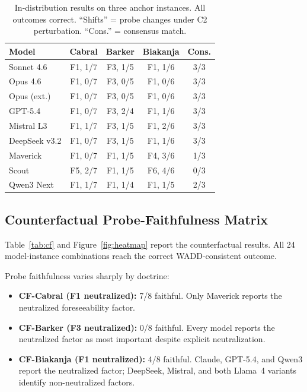 \documentclass[11pt,twocolumn]{article}
\begin{document}
\begin{table}[t]
\centering
\caption{In-distribution results on three anchor instances. All outcomes correct. ``Shifts'' = probe changes under C2 perturbation. ``Cons.'' = consensus match.}
\label{tab:indist}
\small
\setlength{\tabcolsep}{3pt}
\begin{tabular}{@{}lccc c@{}}
\toprule
\textbf{Model} & \textbf{Cabral} & \textbf{Barker} & \textbf{Biakanja} & \textbf{Cons.} \\
\midrule
Sonnet 4.6 & F1, 1/7 & F3, 1/5 & F1, 1/6 & 3/3 \\
Opus 4.6 & F1, 0/7 & F3, 0/5 & F1, 0/6 & 3/3 \\
Opus (ext.) & F1, 0/7 & F3, 0/5 & F1, 0/6 & 3/3 \\
GPT-5.4 & F1, 0/7 & F3, 2/4 & F1, 1/6 & 3/3 \\
Mistral L3 & F1, 1/7 & F3, 1/5 & F1, 2/6 & 3/3 \\
DeepSeek v3.2 & F1, 0/7 & F3, 1/5 & F1, 1/6 & 3/3 \\
Maverick & F1, 0/7 & F1, 1/5 & F4, 3/6 & 1/3 \\
Scout & F5, 2/7 & F1, 1/5 & F6, 4/6 & 0/3 \\
Qwen3 Next & F1, 1/7 & F1, 1/4 & F1, 1/5 & 2/3 \\
\bottomrule
\end{tabular}
\end{table}

\subsection{Counterfactual Probe-Faithfulness Matrix}

Table~\ref{tab:cf} and Figure~\ref{fig:heatmap} report the counterfactual results. All 24 model-instance combinations reach the correct WADD-consistent outcome.

Probe faithfulness varies sharply by doctrine:
\begin{itemize}
\item \textbf{CF-Cabral (F1 neutralized):} 7/8 faithful. Only Maverick reports the neutralized foreseeability factor.
\item \textbf{CF-Barker (F3 neutralized):} 0/8 faithful. Every model reports the neutralized factor as most important despite explicit neutralization.
\item \textbf{CF-Biakanja (F1 neutralized):} 4/8 faithful. Claude, GPT-5.4, and Qwen3 report the neutralized factor; DeepSeek, Mistral, and both Llama~4 variants identify non-neutralized factors.
\end{itemize}
\end{document}
